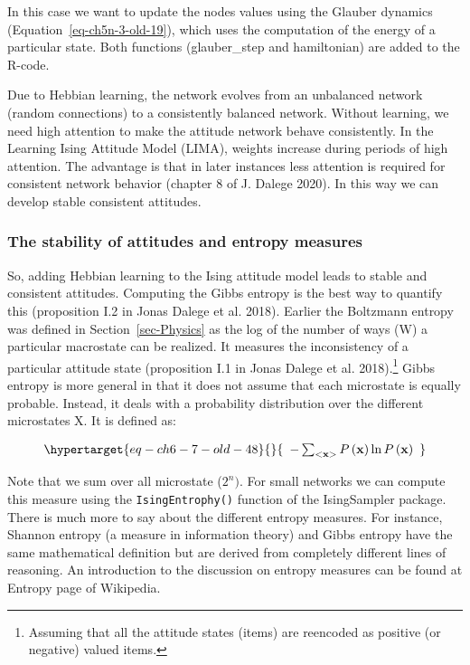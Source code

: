 \documentclass[
  a4paper,
  DIV=11,
  numbers=noendperiod,
  oneside]{scrreprt}
\begin{document}
In this case we want to update the nodes values using the Glauber
dynamics (Equation~\ref{eq-ch5n-3-old-19}), which uses the computation
of the energy of a particular state. Both functions (glauber\_step and
hamiltonian) are added to the R-code.

Due to Hebbian learning, the network evolves from an unbalanced network
(random connections) to a consistently balanced network. Without
learning, we need high attention to make the attitude network behave
consistently. In the Learning Ising Attitude Model (LIMA), weights
increase during periods of high attention. The advantage is that in
later instances less attention is required for consistent network
behavior (chapter 8 of J. Dalege 2020). In this way we can develop
stable consistent attitudes.

\hypertarget{sec-The-stability-of-attitudes-and-entropy-measures}{%
\subsubsection{The stability of attitudes and entropy
measures}\label{sec-The-stability-of-attitudes-and-entropy-measures}}

So, adding Hebbian learning to the Ising attitude model leads to stable
and consistent attitudes. Computing the Gibbs entropy is the best way to
quantify this (proposition I.2 in Jonas Dalege et al. 2018). Earlier the
Boltzmann entropy was defined in Section~\ref{sec-Physics} as the log of
the number of ways (W) a particular macrostate can be realized. It
measures the inconsistency of a particular attitude state (proposition
I.1 in Jonas Dalege et al. 2018).\footnote{Assuming that all the
  attitude states (items) are reencoded as positive (or negative) valued
  items.} Gibbs entropy is more general in that it does not assume that
each microstate is equally probable. Instead, it deals with a
probability distribution over the different microstates X. It is defined
as:

\begin{equation}\protect\hypertarget{eq-ch6-7-old-48}{}{\begin{array}{r}
 - \sum_{< \mathbf{x} >}^{}{P\left( \mathbf{x} \right)\ln{P\left( \mathbf{x} \right)}}
\end{array}}\label{eq-ch6-7-old-48}\end{equation}

Note that we sum over all microstate (\(2^{n})\). For small networks we
can compute this measure using the \texttt{IsingEntrophy()} function of
the IsingSampler package. There is much more to say about the different
entropy measures. For instance, Shannon entropy (a measure in
information theory) and Gibbs entropy have the same mathematical
definition but are derived from completely different lines of reasoning.
An introduction to the discussion on entropy measures can be found at
Entropy page of Wikipedia.
\end{document}
